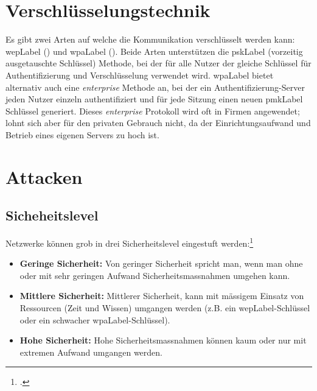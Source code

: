 \section{Verschlüsselungstechnik}
Es gibt zwei Arten auf welche die Kommunikation verschlüsselt werden kann: \gls{wepLabel} () und \gls{wpaLabel} ().
Beide Arten unterstützen die \gls{pskLabel} (vorzeitig ausgetauschte Schlüssel) Methode, bei der für alle Nutzer der gleiche Schlüssel für Authentifizierung und Verschlüsselung verwendet wird.
\gls{wpaLabel} bietet alternativ auch eine \textit{enterprise} Methode an, bei der ein Authentifizierung-Server jeden Nutzer einzeln authentifiziert und für jede Sitzung einen neuen \gls{pmkLabel} Schlüssel generiert.
Dieses \textit{enterprise} Protokoll wird oft in Firmen angewendet; lohnt sich aber für den privaten Gebrauch nicht, da der Einrichtungsaufwand und Betrieb eines eigenen Servers zu hoch ist.

\section{Attacken}

\subsection{Sicheheitslevel}
Netzwerke können grob in drei Sicherheitslevel eingestuft werden:\footcite[][115]{WrightCache201503}
\begin{itemize}
	\item \textbf{Geringe Sicherheit:} Von geringer Sicherheit spricht man, wenn man ohne oder mit sehr geringen Aufwand Sicherheitsmassnahmen umgehen kann.
	\item \textbf{Mittlere Sicherheit:} Mittlerer Sicherheit, kann mit mässigem Einsatz von Ressourcen (Zeit und Wissen) umgangen werden (z.B. ein \gls{wepLabel}-Schlüssel oder ein schwacher \gls{wpaLabel}-Schlüssel).
	\item \textbf{Hohe Sicherheit:} Hohe Sicherheitsmassnahmen können kaum oder nur mit extremen Aufwand umgangen werden.
\end{itemize}

